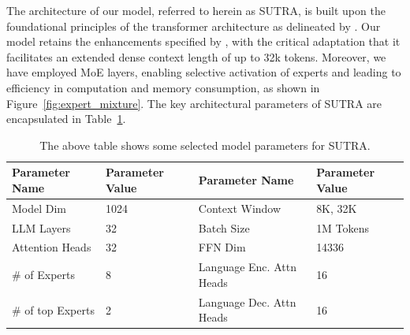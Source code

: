 \documentclass{article}
\begin{document}
The architecture of our model, referred to herein as SUTRA, is built upon the foundational principles of the transformer architecture as delineated by \citet{vaswani2017attention}.
Our model retains the enhancements specified by \citet{jiang2023mistral}, with the critical adaptation that it facilitates an extended dense context length of up to 32k tokens.
Moreover, we have employed MoE layers, enabling selective activation of experts and leading to efficiency in computation and memory consumption, as shown in Figure~\ref{fig:expert_mixture}.
The key architectural parameters of SUTRA are encapsulated in Table~\ref{table:model_parameters}.

\begin{table}[tb]
\setlength{\abovecaptionskip}{10pt} %
\setlength{\belowcaptionskip}{5pt} %
\centering
\begin{tabular}{llll}
\toprule
\textbf{Parameter Name} & \textbf{Parameter Value} & \textbf{Parameter Name} & \textbf{Parameter Value} \\ \midrule
Model Dim               & 1024                     & Context Window          & 8K, 32K                  \\
LLM Layers              & 32                       & Batch Size              & 1M Tokens                \\
Attention Heads         & 32                       & FFN Dim                 & 14336                    \\
\# of Experts           & 8                        & Language Enc. Attn Heads & 16                     \\
\# of top Experts       & 2                        & Language Dec. Attn Heads & 16                     \\ \bottomrule
\end{tabular}
\caption{The above table shows some selected model parameters for SUTRA.}
\label{table:model_parameters}
\end{table}
\end{document}

